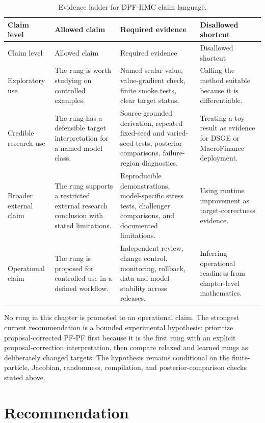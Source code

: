 \begin{longtable}{@{}p{} p{} p{} p{}@{}}
\caption{Evidence ladder for DPF-HMC claim language.}
\label{tab:bf-dpf-hmc-banking-evidence}\\
\toprule
Claim level & Allowed claim & Required evidence & Disallowed shortcut \\
\midrule
\endfirsthead
\toprule
Claim level & Allowed claim & Required evidence & Disallowed shortcut \\
\midrule
\endhead
Exploratory use &
The rung is worth studying on controlled examples. &
Named scalar value, value-gradient check, finite smoke tests, clear target
status. &
Calling the method suitable because it is differentiable. \\
Credible research use &
The rung has a defensible target interpretation for a named model class. &
Source-grounded derivation, repeated fixed-seed and varied-seed tests,
posterior comparisons, failure-region diagnostics. &
Treating a toy result as evidence for DSGE or MacroFinance deployment. \\
Broader external claim &
The rung supports a restricted external research conclusion with stated
limitations. &
Reproducible demonstrations, model-specific stress tests, challenger
comparisons, and documented limitations. &
Using runtime improvement as target-correctness evidence. \\
Operational claim &
The rung is proposed for controlled use in a defined workflow. &
Independent review, change control, monitoring, rollback, data and model
stability across releases. &
Inferring operational readiness from chapter-level mathematics. \\
\bottomrule
\end{longtable}

No rung in this chapter is promoted to an operational claim.  The strongest
current recommendation is a bounded experimental hypothesis: prioritize
proposal-corrected PF-PF first because it is the first rung with an explicit
proposal-correction interpretation, then compare relaxed and learned rungs as
deliberately changed targets.  The hypothesis remains conditional on the finite-
particle, Jacobian, randomness, compilation, and posterior-comparison checks
stated above.

\section{Recommendation}
\label{sec:bf-dpf-hmc-recommendation}

